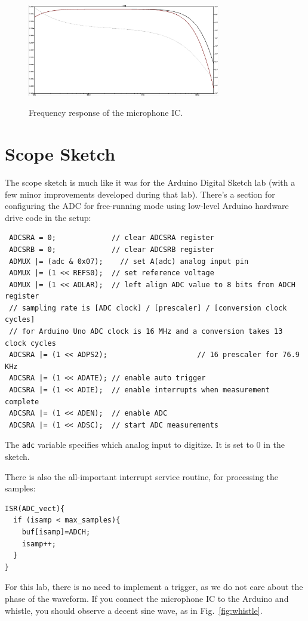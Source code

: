 \documentclass[12pt]{article}
\begin{document}
\begin{figure}[htbp]
\begin{center}
{\includegraphics[width=0.75\textwidth]{figs/freq.png}}
\end{center}
\caption{\label{fig:freq} Frequency response of the microphone IC.}
\end{figure}

\section{Scope Sketch}

The scope sketch is much like it was for the Arduino Digital Sketch lab (with a few minor improvements developed during that lab).  There's a section for configuring the ADC for free-running mode using low-level Arduino hardware drive code in the setup: 
\begin{verbatim}
 ADCSRA = 0;             // clear ADCSRA register
 ADCSRB = 0;             // clear ADCSRB register
 ADMUX |= (adc & 0x07);    // set A(adc) analog input pin
 ADMUX |= (1 << REFS0);  // set reference voltage
 ADMUX |= (1 << ADLAR);  // left align ADC value to 8 bits from ADCH register
 // sampling rate is [ADC clock] / [prescaler] / [conversion clock cycles]
 // for Arduino Uno ADC clock is 16 MHz and a conversion takes 13 clock cycles
 ADCSRA |= (1 << ADPS2);                     // 16 prescaler for 76.9 KHz
 ADCSRA |= (1 << ADATE); // enable auto trigger
 ADCSRA |= (1 << ADIE);  // enable interrupts when measurement complete
 ADCSRA |= (1 << ADEN);  // enable ADC
 ADCSRA |= (1 << ADSC);  // start ADC measurements
\end{verbatim}
The {\tt adc} variable specifies which analog input to digitize.  It is set to 0 in the sketch.

There is also the all-important interrupt service routine, for processing the samples:
\begin{verbatim}
ISR(ADC_vect){
  if (isamp < max_samples){
    buf[isamp]=ADCH;
    isamp++;      
  }
}    
\end{verbatim}
For this lab, there is no need to implement a trigger, as we do not care about the phase of the waveform.
If you connect the microphone IC to the Arduino and whistle, you should observe a decent sine wave, as in Fig.~\ref{fig:whistle}.
\end{document}
